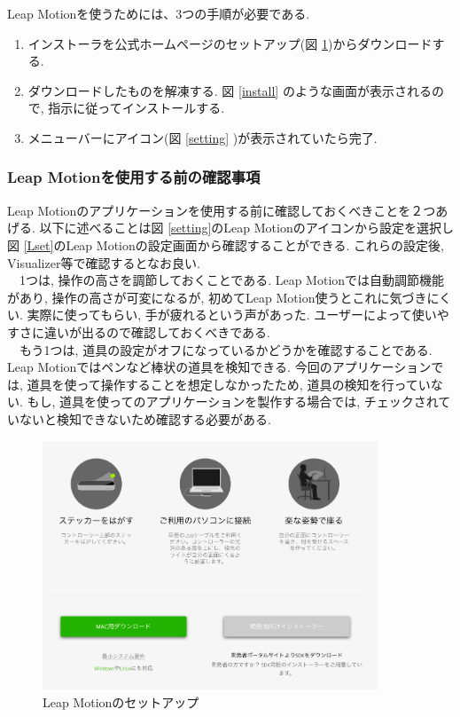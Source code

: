 \documentclass{funthesis}
\begin{document}


Leap Motionを使うためには、3つの手順が必要である. 
\begin{enumerate}
 \item インストーラを公式ホームページのセットアップ(図 \ref{setup})からダウンロードする.
 \item ダウンロードしたものを解凍する. 図 \ref{install} のような画面が表示されるので, 指示に従ってインストールする. 
 \item メニューバーにアイコン(図 \ref{setting} )が表示されていたら完了. 
\end{enumerate}

\subsubsection{Leap Motionを使用する前の確認事項}
Leap Motionのアプリケーションを使用する前に確認しておくべきことを２つあげる. 以下に述べることは図 \ref{setting}のLeap Motionのアイコンから設定を選択し図 \ref{Lset}のLeap Motionの設定画面から確認することができる. これらの設定後, Visualizer等で確認するとなお良い. \\
　1つは, 操作の高さを調節しておくことである. Leap Motionでは自動調節機能があり, 操作の高さが可変になるが, 初めてLeap Motion使うとこれに気づきにくい. 実際に使ってもらい, 手が疲れるという声があった. ユーザーによって使いやすさに違いが出るので確認しておくべきである. \\
　もう1つは, 道具の設定がオフになっているかどうかを確認することである. Leap Motionではペンなど棒状の道具を検知できる. 今回のアプリケーションでは, 道具を使って操作することを想定しなかったため, 道具の検知を行っていない. もし, 道具を使ってのアプリケーションを製作する場合では, チェックされていないと検知できないため確認する必要がある. \\

\begin{figure}[H]
 \begin{center}
  \includegraphics[width=100mm]{./img/setup.png}
 \end{center}
 \caption{Leap Motionのセットアップ}
 \label{setup}
\end{figure}
\end{document}
